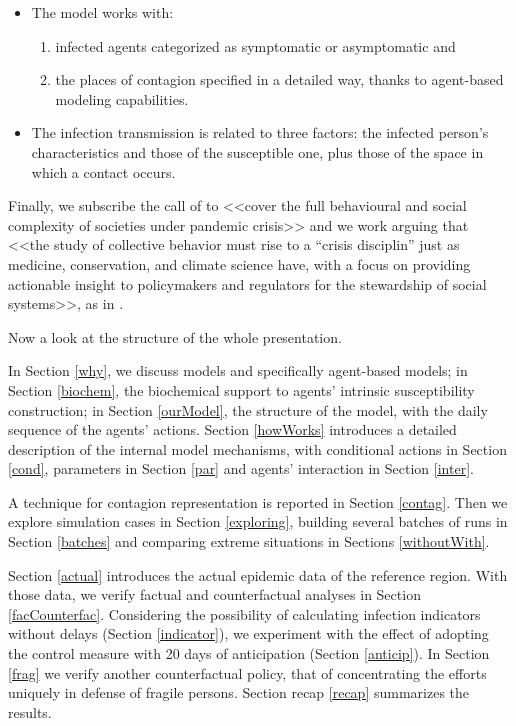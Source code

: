 \documentclass[graybox]{svmult}
\begin{document}
\begin{itemize}

\item

The model works with: 

\begin{enumerate}[label=\roman*]
\item infected agents categorized as symptomatic or asymptomatic and 
\item the places of contagion specified in a detailed way, thanks to agent-based modeling capabilities. 
\end{enumerate}

 \item
The infection transmission is related to three factors: the infected person's characteristics and those of the susceptible one, plus those of the space in which a contact occurs.

\end{itemize}


Finally, we subscribe the call of \cite{squazzoni2020} to <<cover the full behavioural and social complexity of societies under pandemic crisis>> and we work arguing that <<the study of collective behavior must rise to a ``crisis disciplin'' just as medicine, conservation, and climate science have, with a focus on providing actionable insight to policymakers and regulators for the stewardship of social systems>>, as in \cite{Bak-Colemane2025764118}. 

Now a look at the structure of the whole presentation.

In Section \ref{why}, we discuss models and specifically agent-based models; in Section \ref{biochem}, the biochemical support to agents' intrinsic susceptibility construction; in Section \ref{ourModel}, the structure of the model, with the daily sequence of the agents' actions. Section \ref{howWorks} introduces a detailed description of the internal model mechanisms, with conditional actions in Section \ref{cond}, parameters in Section \ref{par} and agents' interaction in Section \ref{inter}.

A technique for contagion representation is reported in Section \ref{contag}. Then we explore simulation cases in Section  \ref{exploring}, building several batches of runs in Section  \ref{batches} and comparing extreme situations in Sections \ref{withoutWith}.

Section \ref{actual} introduces the actual epidemic data of the reference region. With those data, we verify factual and counterfactual analyses in Section \ref{facCounterfac}. Considering the possibility of calculating infection indicators without delays (Section \ref{indicator}), we experiment with the effect of adopting the control measure with 20 days of anticipation (Section \ref{anticip}). In Section \ref{frag} we verify another counterfactual policy, that of concentrating the efforts uniquely in defense of fragile persons. Section recap \ref{recap} summarizes the results.
\end{document}
